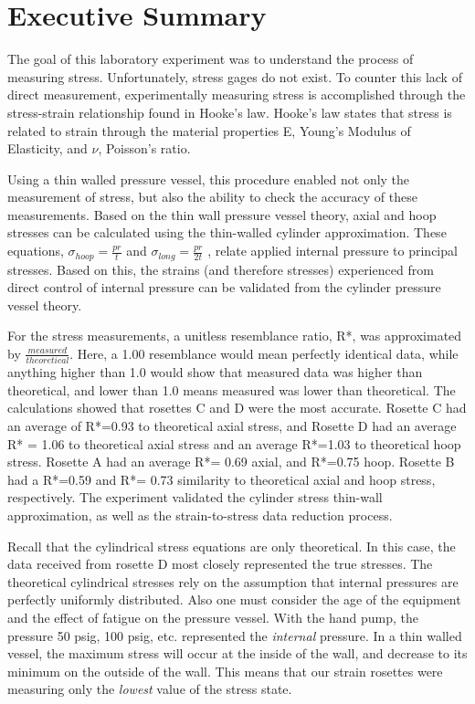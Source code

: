 \documentclass[12pt]{article}
\begin{document}
\section*{Executive Summary}
The goal of this laboratory experiment was to understand the process of measuring stress. Unfortunately, stress gages do not exist. To counter this lack of direct measurement, 
experimentally measuring stress is accomplished through the stress-strain relationship found in Hooke's law. Hooke's law states that stress is related to strain through the material properties E, Young's Modulus of Elasticity, and $\nu$, Poisson's ratio.

Using a thin walled pressure vessel, this procedure enabled not only the measurement of stress, but also the ability to check the accuracy of these measurements. Based on the thin wall pressure vessel theory, axial and hoop stresses can be calculated using the thin-walled cylinder approximation. These equations,  $\sigma_{hoop} = \frac{pr}{t} $  and  $\sigma_{long} = \frac{pr}{2t} $ , relate applied internal  pressure to principal stresses. Based on this, the strains (and therefore stresses) experienced from direct control of internal pressure can be validated from the cylinder pressure vessel theory. 

For the stress measurements, a unitless resemblance ratio, R*, was approximated by $\frac{measured}{theoretical} $. Here, a 1.00 resemblance would mean perfectly identical data, while anything higher than 1.0 would show that measured data was higher than theoretical, and lower than 1.0 means measured was lower than theoretical.
The calculations showed that rosettes C and D were the most accurate. Rosette C had an average of R*=0.93  to theoretical axial stress, and Rosette D had an average R* = 1.06  to theoretical axial stress and an average R*=1.03 to theoretical hoop stress.  Rosette A had an average R*= 0.69 axial, and R*=0.75 hoop. Rosette B had a R*=0.59 and R*= 0.73 similarity to theoretical axial and hoop stress, respectively. The experiment validated the cylinder stress thin-wall approximation, as well as the strain-to-stress data reduction process. 

Recall that the cylindrical stress equations are only theoretical. In this case, the data received
from rosette D most closely represented the true stresses. The theoretical cylindrical stresses rely on the assumption that internal pressures are perfectly uniformly distributed. Also one must consider
the age of the equipment and the effect of fatigue on the pressure vessel. With the hand pump, the
pressure 50 psig, 100 psig, etc. represented the \textit{internal} pressure. In a thin walled vessel, the maximum stress will occur at the inside of the wall, and decrease to its minimum on the outside of the wall. This means that our strain rosettes were measuring only the \textit{lowest} value of the stress state.
\end{document}
